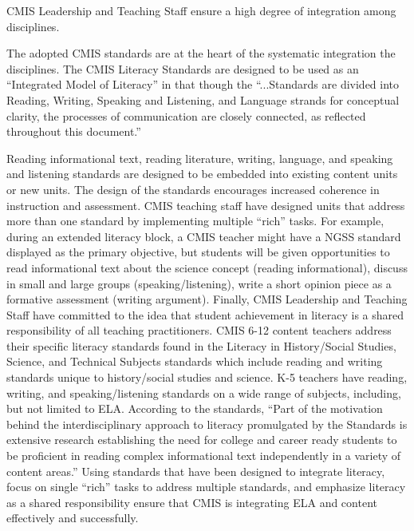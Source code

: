 
\begin{findings}
CMIS Leadership and Teaching Staff ensure a high degree of integration among disciplines. 


The adopted CMIS standards are at the heart of the systematic  integration the disciplines. The CMIS Literacy Standards are designed to be used as an “Integrated Model of Literacy” in that though the “...Standards are divided into Reading, Writing, Speaking and Listening, and Language strands for conceptual clarity, the processes of communication are closely connected, as reflected throughout this document.” 

Reading informational text, reading literature, writing, language, and speaking and listening standards are designed to be embedded into existing content units or new units. The design of the standards encourages increased coherence in instruction and assessment. CMIS teaching staff have designed units that address more than one standard by implementing multiple “rich” tasks. For example, during an extended literacy block, a CMIS teacher might have a NGSS standard displayed as the primary objective, but students will be given opportunities to read informational text about the science concept (reading informational), discuss in small and large groups (speaking/listening), write a short opinion piece as a formative assessment (writing argument). Finally, CMIS Leadership and Teaching Staff have committed to the idea that student achievement in literacy is a shared responsibility of all teaching practitioners. CMIS 6-12 content teachers address their specific literacy standards found in the Literacy in History/Social Studies, Science, and Technical Subjects standards which include reading and writing standards unique to history/social studies and science. K-5 teachers have reading, writing, and speaking/listening standards on a wide range of subjects, including, but not limited to ELA. According to the standards, ``Part of the motivation behind the interdisciplinary approach to literacy promulgated by the Standards is extensive research establishing the need for college and career ready students to be proficient in reading complex informational text independently in a variety of content areas.'' Using standards that have been designed to integrate literacy, focus on single ``rich'' tasks to address multiple standards, and emphasize literacy as a shared responsibility ensure that CMIS is integrating ELA and content effectively and successfully. 


\end{findings}
